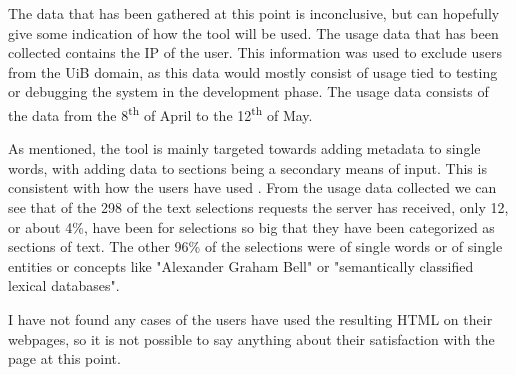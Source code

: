 The data that has been gathered at this point is inconclusive, but can hopefully give some indication of how the tool will be used.
The usage data that has been collected contains the IP of the user.
This information was used to exclude users from the UiB domain,
as this data would mostly consist of usage tied to testing or debugging the system in the development phase.
The usage data consists of the data from the 8\textsuperscript{th}	 of April to the 12\textsuperscript{th} of May.

As mentioned, the tool is mainly targeted towards adding metadata to single words, with adding data to sections being
a secondary means of input.
This is consistent with how the users have used \theartefact.
From the usage data collected we can see that of the 298 of the text selections requests the server has received,
only 12, or about 4\%, have been for selections so big that they have been categorized as sections of text.
The other 96\% of the selections were of single words or of single entities or concepts like "Alexander Graham Bell" or
"semantically classified lexical databases".

I have not found any cases of the users have used the resulting HTML on their webpages,
so it is not possible to say anything about their satisfaction with the page at this point.
